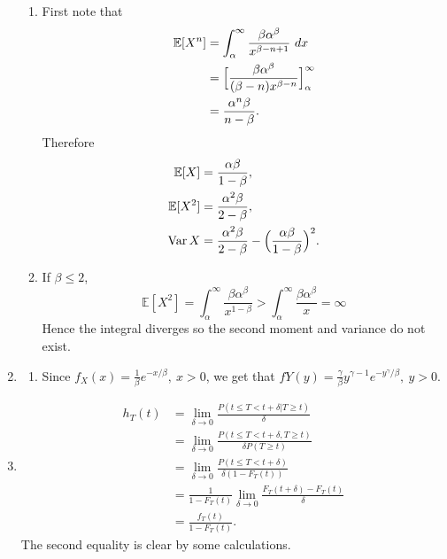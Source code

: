 \documentclass{article}
\DeclareMathOperator{\var}{Var}
\begin{document}
\begin{enumerate}
\begin{enumerate}
        \item First note that 
        \begin{align*}
            \mathbb{E}[X^{n}]
            &= \int_{\alpha}^{\infty} \frac{\beta \alpha^{\beta}}{x^{\beta - n + 1}} \ dx \\
            &= \Bigl[ \frac{\beta \alpha^{\beta}}{(\beta - n)x^{\beta - n}} \Bigr]_{\alpha}^{\infty} \\
            &= \frac{\alpha^{n} \beta}{n - \beta}.
        \end{align*}
        Therefore \begin{align*}
            \mathbb{E}[X] &= \frac{\alpha \beta}{1 - \beta}, \\
            \mathbb{E}[X^2] &= \frac{\alpha^{2} \beta}{2 - \beta}, \\
            \var{X} &= \frac{\alpha^{2} \beta}{2 - \beta} - \Bigl( \frac{\alpha \beta}{1 - \beta} \Bigr)^2.
        \end{align*}

        \item If $\beta \leq 2$, 
        \[ \mathbb{E}[X^2] 
        = \int_{\alpha}^{\infty} \frac{\beta \alpha^{\beta}}{x^{1 - \beta}} 
        > \int_{\alpha}^{\infty} \frac{\beta \alpha^{\beta}}{x} 
        = \infty \]
        Hence the integral diverges so the second moment and variance do not exist.
    \end{enumerate}

    \item \begin{enumerate}
        \item Since $f_{X}(x) = \frac{1}{\beta}e^{-x / \beta}, \ x > 0$, we get that 
        $f{Y}(y) = \frac{\gamma}{\beta} y^{\gamma - 1} e^{-y^\gamma / \beta}, \ y > 0$.
    \end{enumerate}

    \item \begin{align*}
        h_{T}(t) 
        &= \lim_{\delta \to 0} \frac{P(t \leq T < t + \delta | T \geq t)}{\delta} \\
        &= \lim_{\delta \to 0} \frac{P(t \leq T < t + \delta, T \geq t)}{\delta P(T \geq t)} \\
        &= \lim_{\delta \to 0} \frac{P(t \leq T < t + \delta)}{\delta (1 - F_{T}(t))} \\
        &= \frac{1}{1 - F_{T}(t)} \lim_{\delta \to 0} \frac{F_{T}(t + \delta) - F_{T}(t)}{\delta} \\
        &= \frac{f_{T}(t)}{1 - F_{T}(t)}.
    \end{align*}
    The second equality is clear by some calculations.


\end{enumerate}
\end{document}
